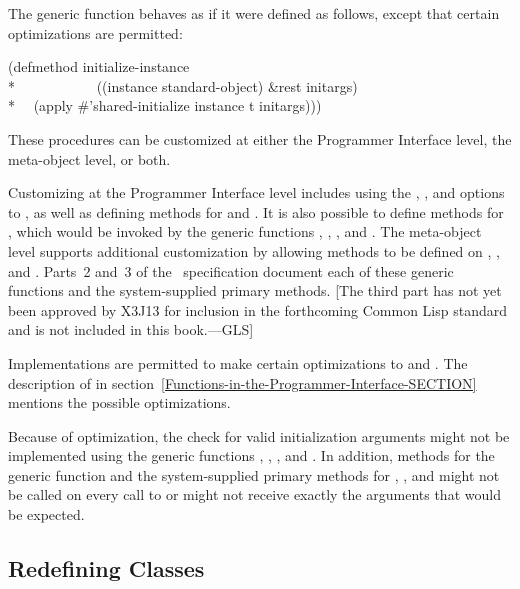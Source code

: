The generic function  behaves as if it were
defined as follows, except that certain optimizations are permitted:

\begin{lisp}
(defmethod initialize-instance \\*
~~~~~~~~~~~((instance standard-object) \&rest initargs) \\*
~~(apply \#'shared-initialize instance t initargs)))
\end{lisp}

These procedures can be customized at either the Programmer Interface level,
the meta-object level, or both.  

Customizing at the Programmer Interface level includes using the 
, , and  options to
, as well as defining methods for 
and .  It is also possible to define
methods for , which would be invoked by the
generic functions , 
, 
, and 
.  The meta-object level supports additional
customization by allowing methods to be defined on 
, , and 
.  Parts~2 and~3 of the \CLOS\ specification document each of these generic
functions and the system-supplied primary methods.
[The third part
has not yet been approved by X3J13 for inclusion in the forthcoming
Common Lisp standard and is not included in this book.---GLS]

Implementations are permitted to make certain optimizations to 
 and .  The
description of  in
section~\ref{Functions-in-the-Programmer-Interface-SECTION}
mentions the
possible optimizations.

Because of optimization, the check for valid initialization arguments
might not be implemented using the generic functions 
, , 
, and . In addition,
methods for the generic function  and the
system-supplied primary methods for , 
,
and  might not be called on
every call to  or might not receive exactly the
arguments that would be expected.


\subsection{Redefining Classes}  
\label{Redefining-Classes-SECTION}  

